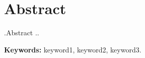 \chapter*{Abstract}
	.Abstract ..\lipsum[1] \lipsum[2] \lipsum[1] \lipsum[2] 
	
	\vspace{5mm}
	
	\noindent \textbf{Keywords:} keyword1, keyword2, keyword3.
	
	